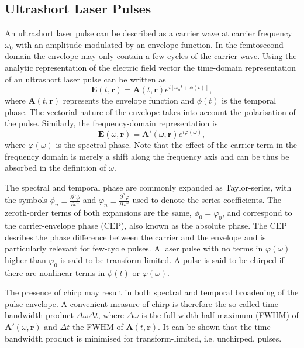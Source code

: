 \documentclass[a4paper]{jpconf}
\begin{document}
\subsection{Ultrashort Laser Pulses}
An ultrashort laser pulse can be described as a carrier wave at carrier frequency $\omega_0$ with an amplitude modulated by an envelope function. In the femtosecond domain the envelope may only contain a few cycles of the carrier wave. Using the analytic representation of the electric field vector the time-domain representation of an ultrashort laser pulse can be written as 
\begin{equation}
\mathbf{E}(t, \mathbf{r}) = \mathbf{A}(t, \mathbf{r}) e^{i[ \omega_o t + \phi(t)]},
\end{equation}
where $\mathbf{A}(t, \mathbf{r})$ represents the envelope function and $\phi(t)$ is the temporal phase. The vectorial nature of the envelope takes into account the polarisation of the pulse. Similarly, the frequency-domain representation is 
\begin{equation}
\mathbf{E}(\omega, \mathbf{r}) = \mathbf{A}'(\omega, \mathbf{r}) e^{i \varphi(\omega)},
\end{equation}
where $\varphi(\omega)$ is the spectral phase. Note that the effect of the carrier term in the frequency domain is merely a shift along the frequency axis and can be thus be absorbed in the definition of $\omega$. \par 
The spectral and temporal phase are commonly expanded as Taylor-series, with the symbols $\phi_n \equiv \frac{\partial^n \phi}{\partial t^n}$ and $\varphi_n \equiv \frac{\partial^n \varphi}{\partial \omega^n}$ used to denote the series coefficients. The zeroth-order terms of both expansions are the same, $\phi_0 = \varphi_0$, and correspond to the carrier-envelope phase (CEP), also known as the absolute phase. The CEP desribes the phase difference between the carrier and the envelope and is particularly relevant for few-cycle pulses. A laser pulse with no terms in $\varphi(\omega)$ higher than $\varphi_0$ is said to be transform-limited. A pulse is said to be chirped if there are nonlinear terms in $\phi(t)$ or $\varphi(\omega)$. \par 
The presence of chirp may result in both spectral and temporal broadening of the pulse envelope. A convenient measure of chirp is therefore the so-called time-bandwidth product $\Delta \omega \Delta t$, where $\Delta \omega$ is the full-width half-maximum (FWHM) of $\mathbf{A}'(\omega, \mathbf{r})$ and $\Delta t$ the FWHM of $\mathbf{A}(t, \mathbf{r})$. It can be shown that the time-bandwidth product is minimised for transform-limited, i.e. unchirped, pulses. \par 
\end{document}

